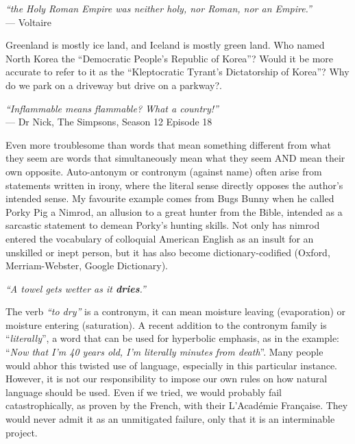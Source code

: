 \begin{center}
\textit{``the Holy Roman Empire was neither holy, nor Roman, nor an Empire.''}
\\--- Voltaire
\end{center}

Greenland is mostly ice land, and Iceland is mostly green land. Who named North Korea the ``Democratic People's Republic of Korea''? Would it be more accurate to refer to it as the ``Kleptocratic Tyrant’s Dictatorship of Korea''? Why do we park on a driveway but drive on a parkway?.

\begin{center}
\textit{``Inflammable means flammable? What a country!''}
\\--- Dr Nick, The Simpsons, Season 12 Episode 18
\end{center}


Even more troublesome than words that mean something different from what they seem are words that simultaneously mean what they seem AND mean their own opposite. Auto-antonym or contronym (against name) often arise from statements written in irony, where the literal sense directly opposes the author's intended sense. My favourite example comes from Bugs Bunny when he called Porky Pig a Nimrod, an allusion to a great hunter from the Bible, intended as a sarcastic statement to demean Porky's hunting skills. Not only has nimrod entered the vocabulary of colloquial American English as an insult for an unskilled or inept person, but it has also become dictionary-codified (Oxford, Merriam-Webster, Google Dictionary).

\begin{center}
    \textit{``A towel gets wetter as it \textbf{dries}.''}
\end{center}

The verb \textit{``to dry''} is a contronym, it can mean moisture leaving (evaporation) or moisture entering (saturation). A recent addition to the contronym family is ``\textit{literally}'', a word that can be used for hyperbolic emphasis, as in the example: ``\textit{Now that I'm 40 years old, I'm literally minutes from death}''. Many people would abhor this twisted use of language, especially in this particular instance. However, it is not our responsibility to impose our own rules on how natural language should be used. Even if we tried, we would probably fail catastrophically, as proven by the French, with their L'Académie Française. They would never admit it as an unmitigated failure, only that it is an interminable project.

